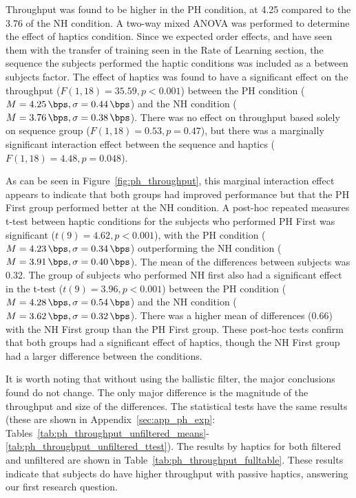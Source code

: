 Throughput was found to be higher in the PH condition, at \SI{4.25}{\bps} compared to the \SI{3.76}{\bps} of the NH condition.
A two-way mixed ANOVA was performed to determine the effect of haptics condition.
Since we expected order effects, and have seen them with the transfer of training seen in the Rate of Learning section, the sequence the subjects performed the haptic conditions was included as a between subjects factor.
The effect of haptics was found to have a significant effect on the throughput ($F(1,18)=35.59, p<0.001$) between the PH condition ($M=\SI{4.25}{\bps}, \sigma=\SI{0.44}{\bps}$) and the NH condition ($M=\SI{3.76}{\bps}, \sigma=\SI{0.38}{\bps}$).
There was no effect on throughput based solely on sequence group ($F(1,18)=0.53, p=0.47$), but there was a marginally significant interaction effect between the sequence and haptics ($F(1,18)=4.48, p=0.048$).

As can be seen in Figure~\ref{fig:ph_throughput}, this marginal interaction effect appears to indicate that both groups had improved performance but that the PH First group performed better at the NH condition.
A post-hoc repeated measures t-test between haptic conditions for the subjects who performed PH First was significant ($t(9)=4.62, p<0.001$), with the PH condition ($M=\SI{4.23}{\bps}, \sigma=\SI{0.34}{\bps}$) outperforming the NH condition ($M=\SI{3.91}{\bps}, \sigma=\SI{0.40}{\bps}$).
The mean of the differences between subjects was \SI{0.32}{\bps}.
The group of subjects who performed NH first also had a significant effect in the t-test ($t(9)=3.96, p<0.001$) between the PH condition ($M=\SI{4.28}{\bps}, \sigma=\SI{0.54}{\bps}$) and the NH condition ($M=\SI{3.62}{\bps}, \sigma=\SI{0.32}{\bps}$).
There was a higher mean of differences (\SI{0.66 }{\bps}) with the NH First group than the PH First group.
These post-hoc tests confirm that both groups had a significant effect of haptics, though the NH First group had a larger difference between the conditions.

It is worth noting that without using the ballistic filter, the major conclusions found do not change.
The only major difference is the magnitude of the throughput and size of the differences.
The statistical tests have the same results (these are shown in Appendix~\ref{sec:app_ph_exp}: Tables~\ref{tab:ph_throughput_unfiltered_means}-\ref{tab:ph_throughput_unfiltered_ttest}).
The results by haptics for both filtered and unfiltered are shown in Table~\ref{tab:ph_throughput_fulltable}.
These results indicate that subjects do have higher throughput with passive haptics, answering our first research question.


